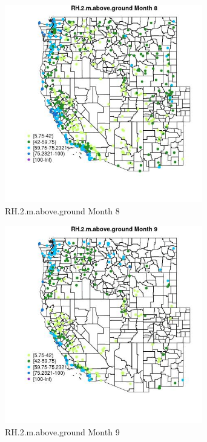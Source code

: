 \begin{figure} 
\centering  
\includegraphics[width=0.77\textwidth]{Code_Outputs/Report_ML_input_PM25_Step4_part_e_de_duplicated_aves_compiled_2019-05-18wNAs_MapObsMo8RH2maboveground.jpg} 
\caption{\label{fig:Report_ML_input_PM25_Step4_part_e_de_duplicated_aves_compiled_2019-05-18wNAsMapObsMo8RH2maboveground}RH.2.m.above.ground Month 8} 
\end{figure} 
 

\begin{figure} 
\centering  
\includegraphics[width=0.77\textwidth]{Code_Outputs/Report_ML_input_PM25_Step4_part_e_de_duplicated_aves_compiled_2019-05-18wNAs_MapObsMo9RH2maboveground.jpg} 
\caption{\label{fig:Report_ML_input_PM25_Step4_part_e_de_duplicated_aves_compiled_2019-05-18wNAsMapObsMo9RH2maboveground}RH.2.m.above.ground Month 9} 
\end{figure} 
 

